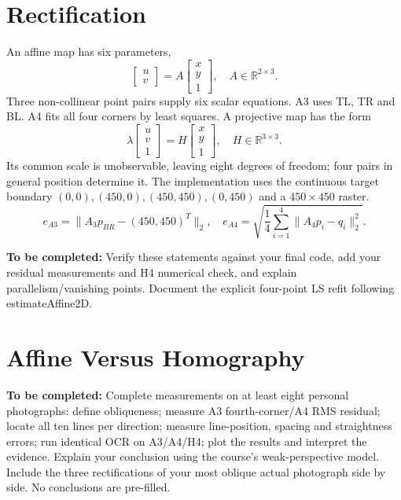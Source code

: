 \documentclass[conference]{IEEEtran}
\newcommand{\draftnote}[1]{\par\noindent\textbf{To be completed:} #1\par}
\begin{document}
\section{Rectification}
An affine map has six parameters,
\begin{equation}
\begin{bmatrix}u\\v\end{bmatrix}=A
\begin{bmatrix}x\\y\\1\end{bmatrix},\quad A\in\mathbb{R}^{2\times3}.
\end{equation}
Three non-collinear point pairs supply six scalar equations. A3 uses TL, TR and BL.
A4 fits all four corners by least squares. A projective map has the form
\begin{equation}
\lambda\begin{bmatrix}u\\v\\1\end{bmatrix}=H
\begin{bmatrix}x\\y\\1\end{bmatrix},\quad H\in\mathbb{R}^{3\times3}.
\end{equation}
Its common scale is unobservable, leaving eight degrees of freedom; four pairs
in general position determine it. The implementation uses the continuous target
boundary $(0,0),(450,0),(450,450),(0,450)$ and a $450\times450$ raster.
\begin{equation}
e_{A3}=\|A_3p_{BR}-(450,450)^T\|_2,
\quad e_{A4}=\sqrt{\frac14\sum_{i=1}^{4}\|A_4p_i-q_i\|_2^2}.
\end{equation}
\draftnote{Verify these statements against your final code, add your residual
measurements and H4 numerical check, and explain parallelism/vanishing points.
Document the explicit four-point LS refit following estimateAffine2D.}

\section{Affine Versus Homography}
\draftnote{Complete measurements on at least eight personal photographs: define obliqueness;
measure A3 fourth-corner/A4 RMS residual; locate all ten lines per direction;
measure line-position, spacing and straightness errors; run identical OCR on
A3/A4/H4; plot the results and interpret the evidence. Explain your conclusion
using the course's weak-perspective model. Include the three rectifications of
your most oblique actual photograph side by side. No conclusions are pre-filled.}
\end{document}

